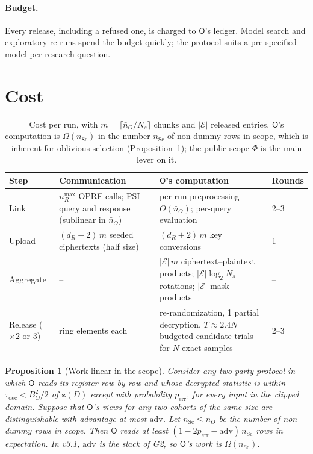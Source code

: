 \documentclass[11pt]{article}
\theoremstyle{definition}
\theoremstyle{plain}
\newtheorem{proposition}{Proposition}[section]
\newcommand{\Party}[1]{\textsf{#1}}
\newcommand{\Op}{\Party{O}}
\begin{document}
\paragraph{Budget.} Every release, including a refused one, is charged to $\Op$'s ledger. Model search and exploratory re-runs spend the budget quickly; the protocol suits a pre-specified model per research question.

\section{Cost}
\label{sec:cost}

\begin{table}[ht]
\centering\small
\caption{Cost per run, with $m = \lceil\bar n_O/N_s\rceil$ chunks and $|\mathcal E|$ released entries. $\Op$'s computation is $\Omega(n_{\mathrm{Sc}})$ in the number $n_{\mathrm{Sc}}$ of non-dummy rows in scope, which is inherent for oblivious selection (Proposition~\ref{prop:lower}); the public scope $\Phi$ is the main lever on it.}
\label{tab:cost}
\begin{tabularx}{\textwidth}{@{}l>{\raggedright\arraybackslash}X>{\raggedright\arraybackslash}X l@{}}
\toprule
Step & Communication & $\Op$'s computation & Rounds \\
\midrule
Link & $n_R^{\max}$ OPRF calls; PSI query and response (sublinear in $\bar n_O$) & per-run preprocessing $O(\bar n_O)$; per-query evaluation & 2--3 \\
Upload & $(d_R + 2)\,m$ seeded ciphertexts (half size) & $(d_R + 2)\,m$ key conversions & 1 \\
Aggregate & -- & $|\mathcal E|\,m$ ciphertext--plaintext products; $|\mathcal E|\log_2 N_s$ rotations; $|\mathcal E|$ mask products & -- \\
Release ($\times 2$ or 3) & 2 ring elements each & 1 re-randomization, 1 partial decryption, $T \approx 2.4N$ budgeted candidate trials for $N$ exact samples & 2--3 \\
\bottomrule
\end{tabularx}
\end{table}

\begin{proposition}[Work linear in the scope]
\label{prop:lower}
Consider any two-party protocol in which $\Op$ reads its register row by row and whose decrypted statistic is within $\tau_{\mathrm{dec}} < B_O^2/2$ of $\mathbf z(D)$ except with probability $p_{\mathrm{err}}$, for every input in the clipped domain. Suppose that $\Op$'s views for any two cohorts of the same size are distinguishable with advantage at most $\mathrm{adv}$. Let $n_{\mathrm{Sc}} \le \bar n_O$ be the number of non-dummy rows in scope. Then $\Op$ reads at least $(1 - 2p_{\mathrm{err}} - \mathrm{adv})\,n_{\mathrm{Sc}}$ rows in expectation. In v3.1, $\mathrm{adv}$ is the slack of G2, so $\Op$'s work is $\Omega(n_{\mathrm{Sc}})$.
\end{proposition}
\end{document}
